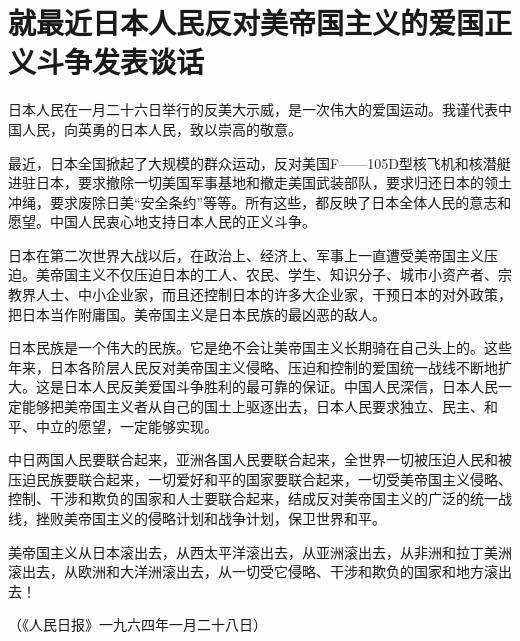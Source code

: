 \section[就最近日本人民反对美帝国主义的爱国正义斗争发表谈话（一九六四年一月二十七日）]{就最近日本人民反对美帝国主义的爱国正义斗争发表谈话}


日本人民在一月二十六日举行的反美大示威，是一次伟大的爱国运动。我谨代表中国人民，向英勇的日本人民，致以崇高的敬意。

最近，日本全国掀起了大规模的群众运动，反对美国F——105D型核飞机和核潜艇进驻日本，要求撤除一切美国军事基地和撤走美国武装部队，要求归还日本的领土冲绳，要求废除日美“安全条约”等等。所有这些，都反映了日本全体人民的意志和愿望。中国人民衷心地支持日本人民的正义斗争。

日本在第二次世界大战以后，在政治上、经济上、军事上一直遭受美帝国主义压迫。美帝国主义不仅压迫日本的工人、农民、学生、知识分子、城市小资产者、宗教界人士、中小企业家，而且还控制日本的许多大企业家，干预日本的对外政策，把日本当作附庸国。美帝国主义是日本民族的最凶恶的敌人。

日本民族是一个伟大的民族。它是绝不会让美帝国主义长期骑在自己头上的。这些年来，日本各阶层人民反对美帝国主义侵略、压迫和控制的爱国统一战线不断地扩大。这是日本人民反美爱国斗争胜利的最可靠的保证。中国人民深信，日本人民一定能够把美帝国主义者从自己的国土上驱逐出去，日本人民要求独立、民主、和平、中立的愿望，一定能够实现。

中日两国人民要联合起来，亚洲各国人民要联合起来，全世界一切被压迫人民和被压迫民族要联合起来，一切爱好和平的国家要联合起来，一切受美帝国主义侵略、控制、干涉和欺负的国家和人士要联合起来，结成反对美帝国主义的广泛的统一战线，挫败美帝国主义的侵略计划和战争计划，保卫世界和平。

美帝国主义从日本滚出去，从西太平洋滚出去，从亚洲滚出去，从非洲和拉丁美洲滚出去，从欧洲和大洋洲滚出去，从一切受它侵略、干涉和欺负的国家和地方滚出去！

{\raggedleft （《人民日报》一九六四年一月二十八日）\par}


